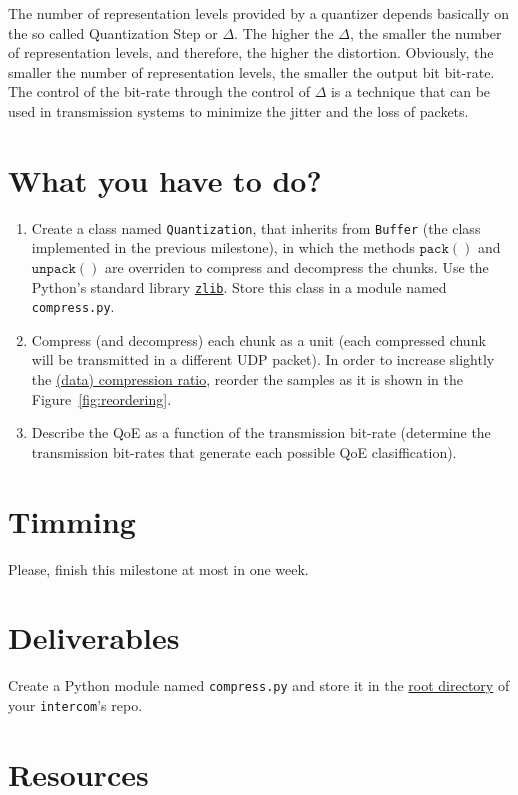 The number of representation levels provided by a quantizer depends
basically on the so called Quantization Step or $\Delta$. The higher
the $\Delta$, the smaller the number of representation levels, and
therefore, the higher the distortion. Obviously, the smaller the
number of representation levels, the smaller the output bit
bit-rate. The control of the bit-rate through the control of $\Delta$
is a technique that can be used in transmission systems to minimize
the jitter and the loss of packets.

\section{What you have to do?}

\begin{enumerate}
\item Create a class named \texttt{Quantization}, that inherits from
  \texttt{Buffer} (the class implemented in the previous milestone),
  in which the methods $\mathtt{pack()}$ and $\mathtt{unpack()}$ are
  overriden to compress and decompress the chunks. Use the Python's
  standard library
  \href{https://docs.python.org/3/library/zlib.html}{\texttt{zlib}}. Store
  this class in a module named \texttt{compress.py}.
\item Compress (and decompress) each chunk as a unit (each compressed
  chunk will be transmitted in a different UDP packet). In order to
  increase slightly the
  \href{https://en.wikipedia.org/wiki/Data_compression_ratio}{(data)
    compression ratio}, reorder the samples as it is shown in the
  Figure~\ref{fig:reordering}.
\item Describe the QoE as a function of the transmission bit-rate
  (determine the transmission bit-rates that generate each possible
  QoE clasiffication).
\end{enumerate}

\section{Timming}

Please, finish this milestone at most in one week.

\section{Deliverables}

Create a Python module named \texttt{compress.py} and store it in the
\href{https://github.com/Tecnologias-multimedia/intercom}{root
  directory} of your \texttt{intercom}'s repo.

\section{Resources}


